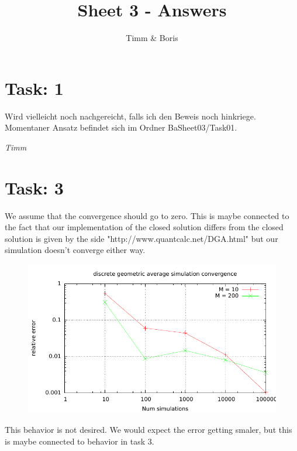 \documentclass{article}
\title{Sheet 3 - Answers}
\author{Timm \& Boris}
\begin{document}
\maketitle

\section*{Task: 1}

Wird vielleicht noch nachgereicht, falls ich den Beweis noch hinkriege.\\
Momentaner Ansatz befindet sich im Ordner BaSheet03/Task01.

{\textit{Timm}}

\section*{Task: 3}

% 
We assume that the convergence should go to zero. This is maybe connected to the fact that our implementation of the closed solution differs from the closed solution is given by the side "http://www.quantcalc.net/DGA.html" but our simulation doesn't converge either way. 
\begin{figure}[htbp]
  \centering
     \includegraphics[width=1.0\textwidth]{../Task03/sh3_task3_convergence_plot.pdf}
\end{figure}
\newpage
This behavior is not desired. We would expect the error getting smaler, but this is maybe connected to behavior in task 3.
\end{document}
